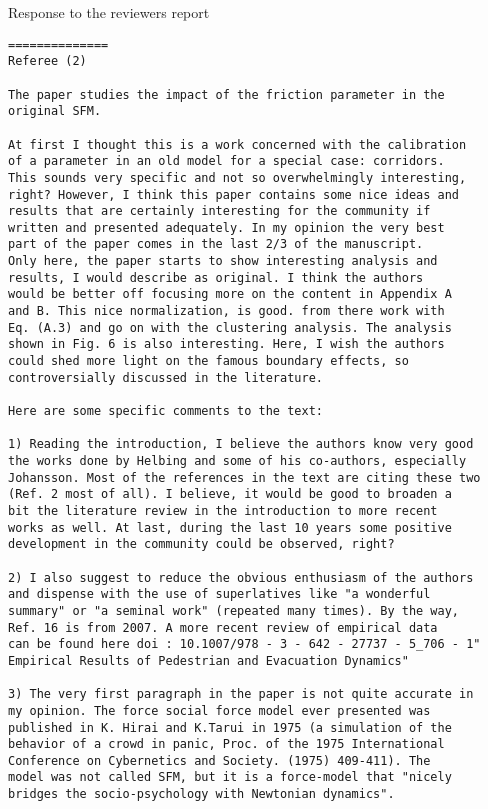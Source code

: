 \documentclass[a4paper,12pt]{letter}
\begin{document}
\begin{letter}{Response to the reviewers report}
{}

\newpage

\begin{verbatim}
==============
Referee (2)

The paper studies the impact of the friction parameter in the 
original SFM.

At first I thought this is a work concerned with the calibration 
of a parameter in an old model for a special case: corridors. 
This sounds very specific and not so overwhelmingly interesting,
right? However, I think this paper contains some nice ideas and 
results that are certainly interesting for the community if 
written and presented adequately. In my opinion the very best 
part of the paper comes in the last 2/3 of the manuscript.
Only here, the paper starts to show interesting analysis and 
results, I would describe as original. I think the authors 
would be better off focusing more on the content in Appendix A
and B. This nice normalization, is good. from there work with 
Eq. (A.3) and go on with the clustering analysis. The analysis 
shown in Fig. 6 is also interesting. Here, I wish the authors 
could shed more light on the famous boundary effects, so
controversially discussed in the literature.

Here are some specific comments to the text:

1) Reading the introduction, I believe the authors know very good 
the works done by Helbing and some of his co-authors, especially 
Johansson. Most of the references in the text are citing these two 
(Ref. 2 most of all). I believe, it would be good to broaden a 
bit the literature review in the introduction to more recent 
works as well. At last, during the last 10 years some positive 
development in the community could be observed, right?

2) I also suggest to reduce the obvious enthusiasm of the authors 
and dispense with the use of superlatives like "a wonderful 
summary" or "a seminal work" (repeated many times). By the way, 
Ref. 16 is from 2007. A more recent review of empirical data 
can be found here doi : 10.1007/978 - 3 - 642 - 27737 - 5_706 - 1"
Empirical Results of Pedestrian and Evacuation Dynamics"

3) The very first paragraph in the paper is not quite accurate in 
my opinion. The force social force model ever presented was 
published in K. Hirai and K.Tarui in 1975 (a simulation of the 
behavior of a crowd in panic, Proc. of the 1975 International 
Conference on Cybernetics and Society. (1975) 409-411). The 
model was not called SFM, but it is a force-model that "nicely 
bridges the socio-psychology with Newtonian dynamics".


\end{verbatim}
\end{letter}
\end{document}
